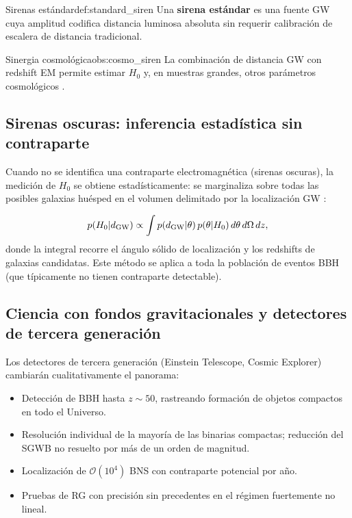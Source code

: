\begin{definicion}{Sirenas estándar}{def:standard_siren}
Una \textbf{sirena estándar} es una fuente GW cuya amplitud codifica distancia luminosa absoluta sin requerir calibración de escalera de distancia tradicional.
\end{definicion}

\begin{observacion}{Sinergia cosmológica}{obs:cosmo_siren}
La combinación de distancia GW con redshift EM permite estimar $H_0$ y, en muestras grandes, otros parámetros cosmológicos \cite{Abbott2017H0}.
\end{observacion}

\subsection{Sirenas oscuras: inferencia estadística sin contraparte}

Cuando no se identifica una contraparte electromagnética (sirenas oscuras), la medición de $H_0$ se obtiene estadísticamente: se marginaliza sobre todas las posibles galaxias huésped en el volumen delimitado por la localización GW \cite{Schutz1986}:

\begin{equation}
  p(H_0|d_{\rm GW}) \propto
  \int p(d_{\rm GW}|\theta)\,p(\theta|H_0)\,d\theta\,d\Omega\,dz,
  \label{eq:dark_siren}
\end{equation}
donde la integral recorre el ángulo sólido de localización y los redshifts de galaxias candidatas. Este método se aplica a toda la población de eventos BBH (que típicamente no tienen contraparte detectable).

\subsection{Ciencia con fondos gravitacionales y detectores de tercera generación}

Los detectores de tercera generación (Einstein Telescope, Cosmic Explorer) cambiarán cualitativamente el panorama:

\begin{itemize}[leftmargin=2em]
  \item Detección de BBH hasta $z\sim 50$, rastreando formación de objetos compactos en todo el Universo.
  \item Resolución individual de la mayoría de las binarias compactas; reducción del SGWB no resuelto por más de un orden de magnitud.
  \item Localización de $\mathcal{O}(10^4)$ BNS con contraparte potencial por año.
  \item Pruebas de RG con precisión sin precedentes en el régimen fuertemente no lineal.
\end{itemize}

